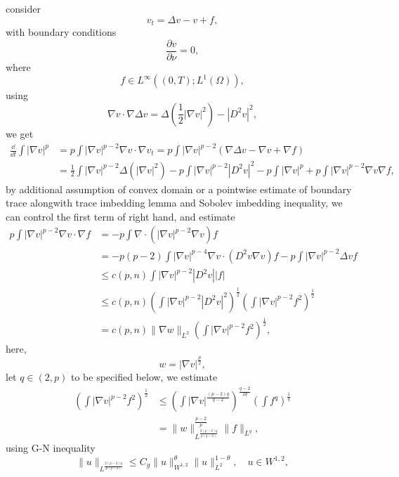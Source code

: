consider \cite{Winkler2023}
\begin{equation}
	v_t = \Delta v - v + f,
\end{equation}
with boundary conditions
\begin{equation*}
	\frac{\partial v}{\partial\nu} = 0,
\end{equation*}
where 
\begin{equation*}
	f\in L^\infty((0,T); L^1(\Omega)),
\end{equation*}
using \[
\nabla v \cdot \nabla \Delta v=\Delta\left(\frac{1}{2}|\nabla v|^2\right)-\left|D^2 v\right|^2,
\]
we get
\begin{align*}
	\frac{\dd}{\dd t}\int|\nabla v|^p 
	&= p\int |\nabla v|^{p-2}\nabla v\cdot \nabla v_t 
	= p\int |\nabla v|^{p-2} (\nabla \Delta v - \nabla v + \nabla f) \\
	&= \frac12\int |\nabla v|^{p-2}\Delta (|\nabla v|^2) - p\int |\nabla v|^{p-2}|D^2v|^2 
		-p\int |\nabla v|^p + p\int |\nabla v|^{p-2}\nabla v \nabla f,
\end{align*}
by additional assumption of convex domain 
or a pointwise estimate of boundary trace alongwith trace imbedding lemma and Sobolev imbedding inequality,
we can control the first term of right hand, and estimate
\begin{align*}
	p\int |\nabla v|^{p-2}\nabla v \cdot \nabla f 
	&= - p\int \nabla\cdot(|\nabla v|^{p-2}\nabla v) f\\
	&= -p(p-2)\int |\nabla v|^{p-4}\nabla v\cdot (D^2v\nabla v) f 
		- p \int |\nabla v|^{p-2}\Delta v f\\
	&\leq c(p,n)\int |\nabla v|^{p-2} |D^2v| |f|\\
	&\leq c(p,n)\left(\int |\nabla v|^{p-2}|D^2v|^2\right)^{\frac12}
	\left(\int |\nabla v|^{p-2}f^2\right)^{\frac12}\\
	&= c(p,n) \|\nabla w\|_{L^2} \left(\int |\nabla v|^{p-2}f^2\right)^{\frac12},
\end{align*}
here, 
\[
	w = |\nabla v|^{\frac{p}{2}},	
\]
let $q\in(2,p)$ to be specified below, we estimate
\begin{align*}
	\left(\int |\nabla v|^{p-2}f^2\right)^{\frac12}
	&\leq \left(\int |\nabla v|^{\frac{(p-2)q}{q-2}}\right)^{\frac{q-2}{2q}}
	\left(\int f^q\right)^{\frac{1}{q}}\\
	&= \|w\|_{L^{\frac{2(p-2)q}{p(q-2)}}}^{\frac{p-2}{p}}
		\|f\|_{L^q},
\end{align*}
using G-N inequality
\[
	\|u\|_{L^{\frac{2(p-2)q}{p(q-2)}}}
	\leq C_g \|u\|_{W^{1,2}}^\theta\|u\|_{L^2}^{1-\theta},\quad u\in W^{1,2}, 
\]
